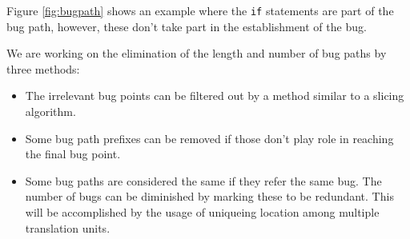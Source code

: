 \documentclass[a0,portrait]{a0poster}
\begin{document}
\begin{multicols}{2}
Figure \ref{fig:bugpath} shows an example where the \texttt{if} statements are 
part of the bug path, however, these don't take part in the establishment of 
the bug.

We are working on the elimination of the length and number of bug paths by 
three methods:
\begin{itemize}
  \item The irrelevant bug points can be filtered out by a method similar to a 
  slicing algorithm.
  \item Some bug path prefixes can be removed if those don't play role in 
  reaching the final bug point.
  \item Some bug paths are considered the same if they refer the same bug. The 
  number of bugs can be diminished by marking these to be redundant. This will 
  be accomplished by the usage of uniqueing location among multiple translation 
  units.
\end{itemize}



\nocite{*} %

\end{multicols}
\end{document}
